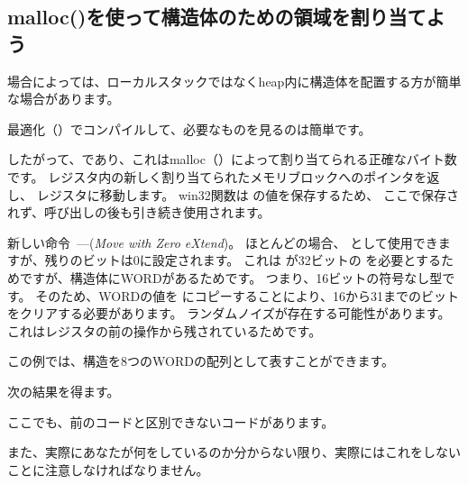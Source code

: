﻿\subsection{malloc()を使って構造体のための領域を割り当てよう}
\label{struct_malloc_example}


場合によっては、ローカルスタックではなく\gls{heap}内に構造体を配置する方が簡単な場合があります。




最適化（\Ox）でコンパイルして、必要なものを見るのは簡単です。




したがって、であり、これはmalloc（）によって割り当てられる正確なバイト数です。 
\EAX レジスタ内の新しく割り当てられたメモリブロックへのポインタを返し、
\ESI レジスタに移動します。
 win32関数は \ESI の値を保存するため、
ここで保存されず、呼び出しの後も引き続き使用されます。


新しい命令~---\MOVZX (\emph{Move with Zero eXtend})。 
ほとんどの場合、 \MOVSX として使用できますが、残りのビットは0に設定されます。
これは \printf が32ビットの \Tint を必要とするためですが、構造体にWORDがあるためです。
つまり、16ビットの符号なし型です。 
そのため、WORDの値を \Tint{} にコピーすることにより、16から31までのビットをクリアする必要があります。
ランダムノイズが存在する可能性があります。これはレジスタの前の操作から残されているためです。

この例では、構造を8つのWORDの配列として表すことができます。



次の結果を得ます。




ここでも、前のコードと区別できないコードがあります。

また、実際にあなたが何をしているのか分からない限り、実際にはこれをしないことに注意しなければなりません。

